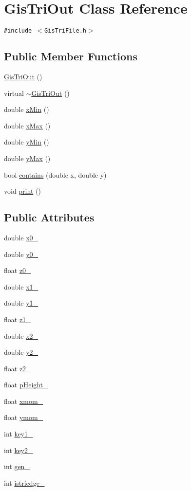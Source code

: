 \hypertarget{classGisTriOut}{
\section{Gis\-Tri\-Out Class Reference}
\label{classGisTriOut}
}
{\tt \#include $<$Gis\-Tri\-File.h$>$}

\subsection*{Public Member Functions}
\begin{CompactItemize}
\item 
\hyperlink{classGisTriOut_a0}{Gis\-Tri\-Out} ()
\item 
virtual \hyperlink{classGisTriOut_a1}{$\sim$Gis\-Tri\-Out} ()
\item 
double \hyperlink{classGisTriOut_a2}{x\-Min} ()
\item 
double \hyperlink{classGisTriOut_a3}{x\-Max} ()
\item 
double \hyperlink{classGisTriOut_a4}{y\-Min} ()
\item 
double \hyperlink{classGisTriOut_a5}{y\-Max} ()
\item 
bool \hyperlink{classGisTriOut_a6}{contains} (double x, double y)
\item 
void \hyperlink{classGisTriOut_a7}{print} ()
\end{CompactItemize}
\subsection*{Public Attributes}
\begin{CompactItemize}
\item 
double \hyperlink{classGisTriOut_o0}{x0\_\-}
\item 
double \hyperlink{classGisTriOut_o1}{y0\_\-}
\item 
float \hyperlink{classGisTriOut_o2}{z0\_\-}
\item 
double \hyperlink{classGisTriOut_o3}{x1\_\-}
\item 
double \hyperlink{classGisTriOut_o4}{y1\_\-}
\item 
float \hyperlink{classGisTriOut_o5}{z1\_\-}
\item 
double \hyperlink{classGisTriOut_o6}{x2\_\-}
\item 
double \hyperlink{classGisTriOut_o7}{y2\_\-}
\item 
float \hyperlink{classGisTriOut_o8}{z2\_\-}
\item 
float \hyperlink{classGisTriOut_o9}{p\-Height\_\-}
\item 
float \hyperlink{classGisTriOut_o10}{xmom\_\-}
\item 
float \hyperlink{classGisTriOut_o11}{ymom\_\-}
\item 
int \hyperlink{classGisTriOut_o12}{key1\_\-}
\item 
int \hyperlink{classGisTriOut_o13}{key2\_\-}
\item 
int \hyperlink{classGisTriOut_o14}{gen\_\-}
\item 
int \hyperlink{classGisTriOut_o15}{istriedge\_\-}
\end{CompactItemize}


